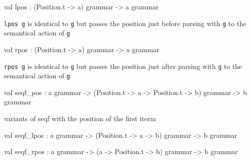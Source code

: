 \documentclass[11pt]{article}
\begin{document}
\label{val:Grammar.lpos}\begin{ocamldoccode}
val lpos : (Position.t -> {\textquotesingle}a) grammar -> {\textquotesingle}a grammar
\end{ocamldoccode}
\begin{ocamldocdescription}
{\tt{lpos g}} is identical to {\tt{g}} but passes the position just before parsing with
    {\tt{g}} to the semantical action of {\tt{g}}


\end{ocamldocdescription}




\label{val:Grammar.rpos}\begin{ocamldoccode}
val rpos : (Position.t -> {\textquotesingle}a) grammar -> {\textquotesingle}a grammar
\end{ocamldoccode}
\begin{ocamldocdescription}
{\tt{rpos g}} is identical to {\tt{g}} but passes the position just after parsing with
    {\tt{g}} to the semantical action of {\tt{g}}


\end{ocamldocdescription}




\label{val:Grammar.seqf-underscorepos}\begin{ocamldoccode}
val seqf_pos :
  {\textquotesingle}a grammar ->
  (Position.t -> {\textquotesingle}a -> Position.t -> {\textquotesingle}b) grammar -> {\textquotesingle}b grammar
\end{ocamldoccode}
\begin{ocamldocdescription}
variants of seqf with the position of the first iterm


\end{ocamldocdescription}




\label{val:Grammar.seqf-underscorelpos}\begin{ocamldoccode}
val seqf_lpos :
  {\textquotesingle}a grammar ->
  (Position.t -> {\textquotesingle}a -> {\textquotesingle}b) grammar -> {\textquotesingle}b grammar
\end{ocamldoccode}




\label{val:Grammar.seqf-underscorerpos}\begin{ocamldoccode}
val seqf_rpos :
  {\textquotesingle}a grammar ->
  ({\textquotesingle}a -> Position.t -> {\textquotesingle}b) grammar -> {\textquotesingle}b grammar
\end{ocamldoccode}
\end{document}
